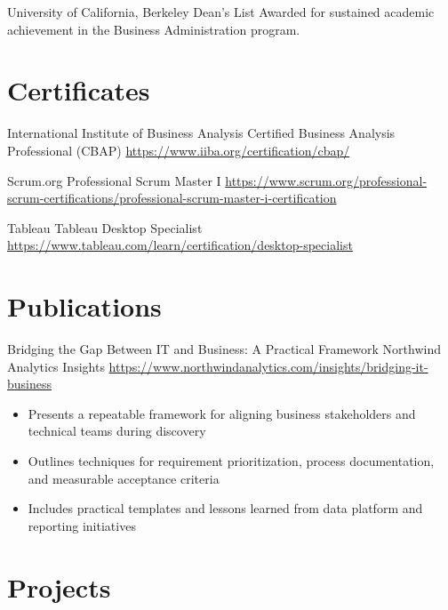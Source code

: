 \documentclass[a4paper, serif, 10pt]{moderncv}
\begin{document}
        {University of California, Berkeley}
        {Dean's List}
        {}
        {}
        {Awarded for sustained academic achievement in the Business Administration program.}
\section{Certificates}

        {International Institute of Business Analysis}
        {Certified Business Analysis Professional (CBAP)}
        {\url{https://www.iiba.org/certification/cbap/}}
        {}
        {}

        {Scrum.org}
        {Professional Scrum Master I}
        {\url{https://www.scrum.org/professional-scrum-certifications/professional-scrum-master-i-certification}}
        {}
        {}

        {Tableau}
        {Tableau Desktop Specialist}
        {\url{https://www.tableau.com/learn/certification/desktop-specialist}}
        {}
        {}
\section{Publications}

        {Bridging the Gap Between IT and Business: A Practical Framework}
        {Northwind Analytics Insights}
        {\url{https://www.northwindanalytics.com/insights/bridging-it-business}}
        {}
        {\begin{itemize}
\item Presents a repeatable framework for aligning business stakeholders and technical teams during discovery
\item Outlines techniques for requirement prioritization, process documentation, and measurable acceptance criteria
\item Includes practical templates and lessons learned from data platform and reporting initiatives
\end{itemize}}
\section{Projects}
\end{document}
